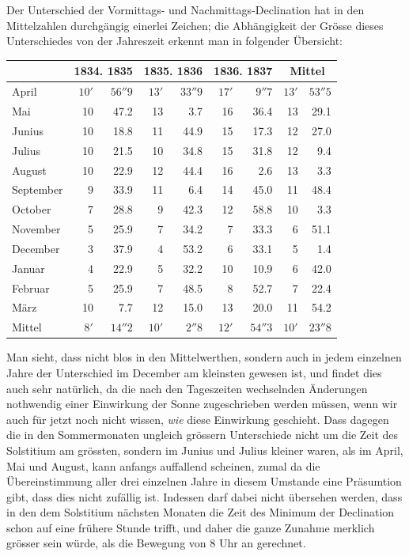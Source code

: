 Der Unterschied der Vormittags- und Nachmittags-Declination hat in den Mittelzahlen durchgängig einerlei Zeichen; die Abhängigkeit der Grösse dieses Unterschiedes von der Jahreszeit erkennt man in folgender Übersicht:
\begin{center}\small
\begin{tabular}{l||rr|rr|rr||rr}
&\multicolumn{2}{c|}{1834. 1835}&\multicolumn{2}{c|}{1835. 1836}&\multicolumn{2}{c||}{1836. 1837}&\multicolumn{2}{c}{Mittel}\\\hline\hline
April&$10'$&$56''9$&$13'$&$33''9$&$17'$&$9''7$&$13'$&$53''5$\\
Mai&10&47.2&13&3.7&16&36.4&13&29.1\\
Junius&10&18.8&11&44.9&15&17.3&12&27.0\\
Julius&10&21.5&10&34.8&15&31.8&12&9.4\\
August&10&22.9&12&44.4&16&2.6&13&3.3\\
September&9&33.9&11&6.4&14&45.0&11&48.4\\
October&7&28.8&9&42.3&12&58.8&10&3.3\\
November&5&25.9&7&34.2&7&33.3&6&51.1\\
December&3&37.9&4&53.2&6&33.1&5&1.4\\
Januar&4&22.9&5&32.2&10&10.9&6&42.0\\
Februar&5&25.9&7&48.5&8&52.7&7&22.4\\
März&10&7.7&12&15.0&13&20.0&11&54.2\\\hline\hline
Mittel&$8'$&$14''2$&$10'$&$2''8$&$12'$&$54''3$&$10'$&$23''8$
\end{tabular}
\end{center}
Man sieht, dass nicht blos in den Mittelwerthen, sondern auch in jedem einzelnen Jahre der Unterschied im December am kleinsten gewesen ist, und findet dies auch sehr natürlich, da die nach den Tageszeiten wechselnden Änderungen nothwendig einer Einwirkung der Sonne zugeschrieben werden müssen, wenn wir auch für jetzt noch nicht wissen, \textit{wie} diese Einwirkung geschieht. Dass dagegen die in den Sommermonaten ungleich grössern Unterschiede nicht um die
Zeit des Solstitium am grössten, sondern im Junius und Julius kleiner waren, als im April, Mai und August, kann anfangs auffallend scheinen, zumal da die Übereinstimmung aller drei einzelnen Jahre in diesem Umstande eine Präsumtion gibt, dass dies nicht zufällig ist. Indessen darf dabei nicht übersehen werden, dass in den dem Solstitium nächsten Monaten die Zeit des Minimum der Declination schon auf eine frühere Stunde trifft, und daher die ganze Zunahme merklich grösser sein würde, als die Bewegung von 8 Uhr an gerechnet.

